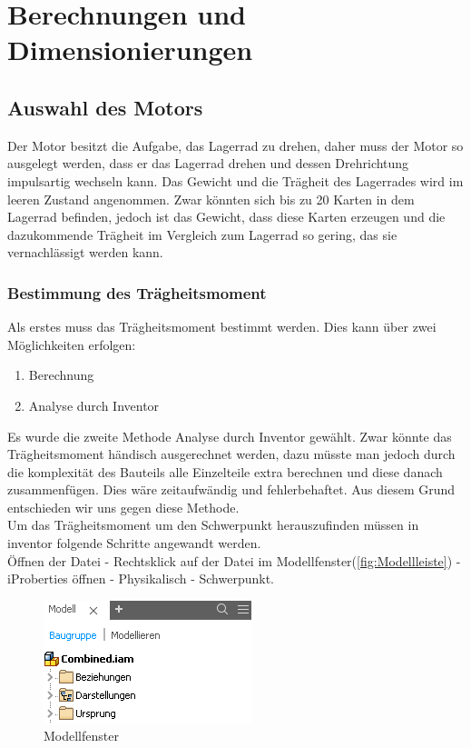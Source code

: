 \section{Berechnungen und Dimensionierungen}
\subsection{Auswahl des Motors}

Der Motor besitzt die Aufgabe, das Lagerrad zu drehen, daher muss der Motor so ausgelegt werden, dass
er das Lagerrad drehen und dessen Drehrichtung impulsartig wechseln kann.
Das Gewicht und die Trägheit des Lagerrades wird im leeren Zustand angenommen.
Zwar könnten sich bis zu 20 Karten in dem Lagerrad befinden,
jedoch ist das Gewicht, dass diese Karten erzeugen und die dazukommende Trägheit im Vergleich zum Lagerrad
so gering, das sie vernachlässigt werden kann.

\subsubsection{Bestimmung des Trägheitsmoment}

Als erstes muss das Trägheitsmoment bestimmt werden.
Dies kann über zwei Möglichkeiten erfolgen:
\begin{enumerate}
    \item Berechnung
    \item Analyse durch Inventor
\end{enumerate}

Es wurde die zweite Methode Analyse durch Inventor gewählt.
Zwar könnte das Trägheitsmoment händisch ausgerechnet werden,
dazu müsste man jedoch durch die komplexität des Bauteils alle Einzelteile extra berechnen und diese danach zusammenfügen.
Dies wäre zeitaufwändig und fehlerbehaftet.
Aus diesem Grund entschieden wir uns gegen diese Methode. \\

Um das Trägheitsmoment um den Schwerpunkt herauszufinden müssen in inventor folgende Schritte
angewandt werden.\\
Öffnen der Datei - Rechtsklick auf der Datei im Modellfenster(\autoref{fig:Modellleiste}) - iProberties öffnen - Physikalisch -  Schwerpunkt.\\
\begin{figure}[H]
    \centering
    \includegraphics[scale=1,page=1]{fig/mech/Modellfenser}
    \caption{Modellfenster}
    \label{fig:Modellleiste}
\end{figure}


